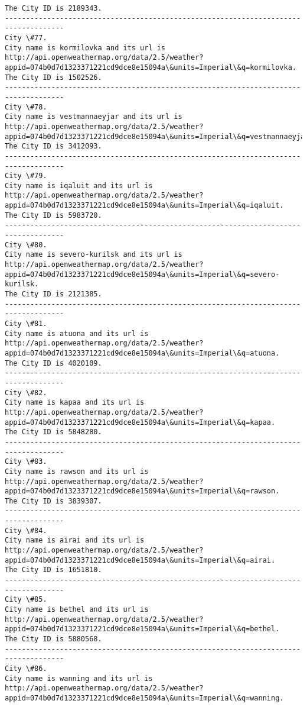 \documentclass[11pt]{article}
\begin{document}
\begin{Verbatim}[commandchars=\\\{\}]
The City ID is 2189343.
------------------------------------------------------------------------------------
City \#77.
City name is kormilovka and its url is http://api.openweathermap.org/data/2.5/weather?appid=074b0d7d1323371221cd9dce8e15094a\&units=Imperial\&q=kormilovka.
The City ID is 1502526.
------------------------------------------------------------------------------------
City \#78.
City name is vestmannaeyjar and its url is http://api.openweathermap.org/data/2.5/weather?appid=074b0d7d1323371221cd9dce8e15094a\&units=Imperial\&q=vestmannaeyjar.
The City ID is 3412093.
------------------------------------------------------------------------------------
City \#79.
City name is iqaluit and its url is http://api.openweathermap.org/data/2.5/weather?appid=074b0d7d1323371221cd9dce8e15094a\&units=Imperial\&q=iqaluit.
The City ID is 5983720.
------------------------------------------------------------------------------------
City \#80.
City name is severo-kurilsk and its url is http://api.openweathermap.org/data/2.5/weather?appid=074b0d7d1323371221cd9dce8e15094a\&units=Imperial\&q=severo-kurilsk.
The City ID is 2121385.
------------------------------------------------------------------------------------
City \#81.
City name is atuona and its url is http://api.openweathermap.org/data/2.5/weather?appid=074b0d7d1323371221cd9dce8e15094a\&units=Imperial\&q=atuona.
The City ID is 4020109.
------------------------------------------------------------------------------------
City \#82.
City name is kapaa and its url is http://api.openweathermap.org/data/2.5/weather?appid=074b0d7d1323371221cd9dce8e15094a\&units=Imperial\&q=kapaa.
The City ID is 5848280.
------------------------------------------------------------------------------------
City \#83.
City name is rawson and its url is http://api.openweathermap.org/data/2.5/weather?appid=074b0d7d1323371221cd9dce8e15094a\&units=Imperial\&q=rawson.
The City ID is 3839307.
------------------------------------------------------------------------------------
City \#84.
City name is airai and its url is http://api.openweathermap.org/data/2.5/weather?appid=074b0d7d1323371221cd9dce8e15094a\&units=Imperial\&q=airai.
The City ID is 1651810.
------------------------------------------------------------------------------------
City \#85.
City name is bethel and its url is http://api.openweathermap.org/data/2.5/weather?appid=074b0d7d1323371221cd9dce8e15094a\&units=Imperial\&q=bethel.
The City ID is 5880568.
------------------------------------------------------------------------------------
City \#86.
City name is wanning and its url is http://api.openweathermap.org/data/2.5/weather?appid=074b0d7d1323371221cd9dce8e15094a\&units=Imperial\&q=wanning.

\end{Verbatim}
\end{document}
